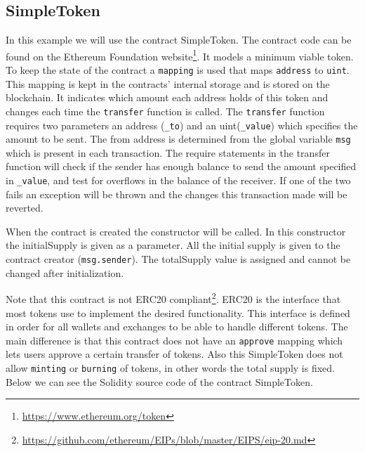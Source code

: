 \documentclass[a4paper]{article}
\begin{document}
\subsection{SimpleToken}
In this example we will use the contract SimpleToken. The contract code can be found on the Ethereum Foundation website\footnote{\url{https://www.ethereum.org/token}}. 
It models a minimum viable token. To keep the state of the contract a \texttt{mapping} is used that maps \texttt{address} to \texttt{uint}. This mapping is kept in the contracts' internal storage and is stored on the blockchain. It indicates which amount each address holds of this token and changes each time the \texttt{transfer} function is called. The \texttt{transfer} function requires two parameters an address (\texttt{\_to})  and an uint(\texttt{\_value}) which specifies the amount to be sent. The from address is determined from the global variable \texttt{msg} which is present in each transaction. The require statements in the transfer function will check if the sender has enough balance to send the amount specified in \texttt{\_value}, and test for overflows in the balance of the receiver. If one of the two fails an exception will be thrown and the changes this transaction made will be reverted.\par
When the contract is created the constructor will be called. In this constructor the initialSupply is given as a parameter. All the initial supply is given to the contract creator (\texttt{msg.sender}). The totalSupply value is assigned and cannot be changed after initialization.\par
Note that this contract is not ERC20 compliant\footnote{\url{https://github.com/ethereum/EIPs/blob/master/EIPS/eip-20.md}}. ERC20 is the interface that most tokens use to implement the desired functionality. This interface is defined in order for all wallets and exchanges to be able to handle different tokens. The main difference is that this contract does not have an \texttt{approve} mapping which lets users approve a certain transfer of tokens. Also this SimpleToken does not allow \texttt{minting} or \texttt{burning} of tokens, in other words the total supply is fixed. Below we can see the Solidity source code of the contract SimpleToken.


\end{document}
